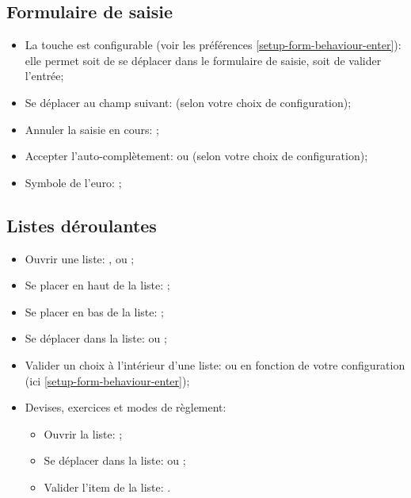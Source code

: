 \subsection{Formulaire de saisie }

\begin{itemize}
	\item La touche  est configurable (voir les préférences \vref{setup-form-behaviour-enter}): elle permet soit de se déplacer dans le formulaire de saisie, soit de valider l'entrée;
	\item Se déplacer au champ suivant:  (selon votre choix de configuration);
	\item Annuler la saisie en cours: ;
	\item Accepter l'auto-complètement:  ou  (selon votre choix de configuration);
	\item Symbole de l'euro: ;
\end{itemize}


\subsection{Listes déroulantes}

\begin{itemize}
	\item Ouvrir une liste: ,  ou ;
	\item Se placer en haut de la liste: ;
	\item Se placer en bas de la liste: ;
	\item Se déplacer dans la liste:  ou ;
	\item Valider un choix à l'intérieur d'une liste:  ou  en fonction de votre configuration (ici \vref{setup-form-behaviour-enter});
	\item Devises, exercices et modes de règlement:
		\begin{itemize}
			\item Ouvrir la liste: ; 
			\item Se déplacer dans la liste:  ou ;
			\item Valider l'item de la liste: .
		\end{itemize}
\end{itemize}


